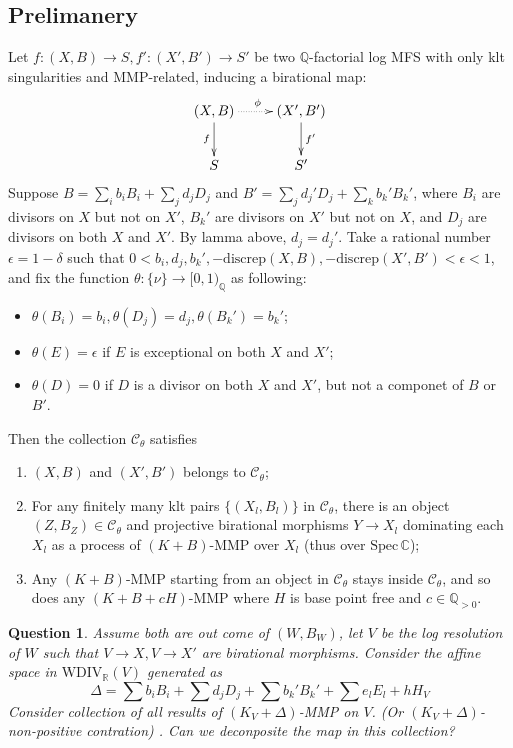 \documentclass{article}
\newtheorem*{ques}{Question}
\begin{document}
\subsection{Prelimanery}
		Let $ f:(X,B)\to S,f':(X',B')\to S' $ be two $ \mathbb{Q} $-factorial log MFS  with only klt singularities and MMP-related, inducing a birational map:
		$$ \xymatrix{
			(X,B)\ar[d]_f\ar@{.>}[r]^\phi&(X',B')\ar[d]^{f'}\\
			S&S'} $$
		Suppose  $ B=\sum_ib_iB_i+\sum_jd_jD_j $ and $ B'=\sum_jd_j'D_j+\sum_kb_k'B_k' $, where $ B_i $ are divisors on $ X $ but not on $ X' $, $ B_k' $ are divisors on $ X' $ but not on $ X $, and $ D_j $ are divisors on both $ X $ and $ X' $. By lamma above, $ d_j=d_j' $. Take a rational number $ \epsilon=1-\delta $ such that $ 0<b_i,d_j,b_k', -\mathrm{discrep}(X,B),-\mathrm{discrep}(X',B')<\epsilon<1 $, and fix the function $ \theta:\{\nu\}\to [0,1)_\mathbb{Q} $ as following:
		\begin{itemize}
			\item $ \theta(B_i)=b_i, \theta(D_j)=d_j,\theta(B_k')=b_k'$;
			\item $ \theta(E)=\epsilon $ if $ E $ is exceptional on both $ X $ and $ X' $;
			\item $ \theta(D)=0 $ if $ D $ is a divisor on both $ X $ and $ X' $, but not a componet of $ B $ or $ B' $.
		\end{itemize}
		Then the collection $ \mathcal{C}_\theta $ satisfies
		\begin{enumerate}[1)]
			\item $ (X,B) $ and $ (X',B') $ belongs to $ \mathcal{C}_\theta $;
			\item For any finitely many klt pairs $ \{(X_l,B_l)\} $ in $ \mathcal{C}_\theta $, there is an object $ (Z,B_Z)\in \mathcal{C}_\theta $ and projective birational morphisms $ Y\to X_l $ dominating each	$ X_l $ as a process of $ (K+B) $-MMP over $ X_l $ (thus over $ \mathrm{Spec}\,\mathbb{C} $);
			\item Any $ (K+B) $-MMP starting from an object in $ \mathcal{C}_\theta $ stays inside $ \mathcal{C}_\theta $, and so does any $ (K+B+cH) $-MMP where $ H $ is base point free and $ c\in \mathbb{Q}_{>0} $. 
		\end{enumerate}
\begin{ques}
	Assume both are out come of $ (W,B_W) $,  let $ V $ be the  log resolution of $ W $ such that $ V\to X,V\to X' $ are birational morphisms. Consider the affine space in $ \mathrm{WDIV}_\mathbb{R}(V) $ generated as  
	$$  \Delta=\sum b_iB_i+\sum d_jD_j+\sum b_k'B_k'+\sum e_lE_l+hH_V $$
	Consider collection of all results of $ (K_V+\Delta) $-MMP on $ V $. (Or $ (K_V+\Delta) $-non-positive contration) . Can we deconposite the map in this collection?
\end{ques}
	
\end{document}
